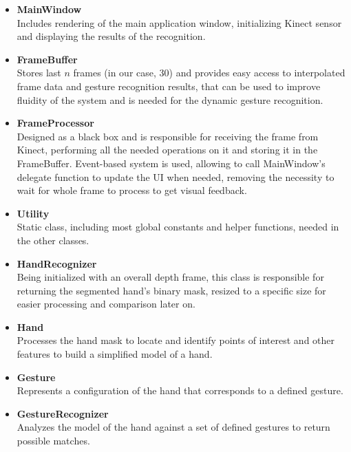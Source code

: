 \documentclass[a4paper,11pt,oneside]{article}
\begin{document}
\begin{itemize}
\item \textbf{MainWindow}\\
Includes rendering of the main application window, initializing Kinect sensor and displaying the results of the recognition.

\item \textbf{FrameBuffer}\\
Stores last $n$ frames (in our case, 30) and provides easy access to interpolated frame data and gesture recognition results, that can be used to improve fluidity of the system and is needed for the dynamic gesture recognition.

\item \textbf{FrameProcessor}\\
Designed as a black box and is responsible for receiving the frame from Kinect, performing all the needed operations on it and storing it in the FrameBuffer. Event-based system is used, allowing to call MainWindow's delegate function to update the UI when needed, removing the necessity to wait for whole frame to process to get visual feedback.

\item \textbf{Utility}\\
Static class, including most global constants and helper functions, needed in the other classes.

\item \textbf{HandRecognizer}\\
Being initialized with an overall depth frame, this class is responsible for returning the segmented hand's binary mask, resized to a specific size for easier processing and comparison later on.

\item \textbf{Hand}\\
Processes the hand mask to locate and identify points of interest and other features to build a simplified model of a hand.

\item \textbf{Gesture}\\
Represents a configuration of the hand that corresponds to a defined gesture.

\item \textbf{GestureRecognizer}\\
Analyzes the model of the hand against a set of defined gestures to return possible matches.

\end{itemize}
\end{document}
